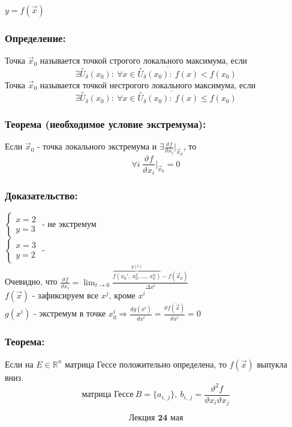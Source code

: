 \documentclass[12pt, letterpaper, twoside]{article}
\newcommand{\Underl}[1]{$\underline{\text{#1}}$}
\newcommand{\DS}{\displaystyle}
\newcommand{\mb}[1]{\mathbb{#1}}
\begin{document}
    $y = f(\vec{x})$
    \subsubsection*{Определение:}
    Точка $\vec{x}_0$ называется точкой \Underl{строгого локального максимума}, если
    \[\exists \overset{\circ}{U}_{\delta}(x_0):\ \forall x\in \overset{\circ}{U}_{\delta}(x_0):\ f(x) < f(x_0)\]
    Точка $\vec{x}_0$ называется точкой \Underl{нестрогого локального максимума}, если
    \[\exists \overset{\circ}{U}_{\delta}(x_0):\ \forall x\in \overset{\circ}{U}_{\delta}(x_0):\ f(x) \leq f(x_0)\]
    \subsubsection*{Теорема (необходимое условие экстремума):}
    Если $\vec{x}_0$ - точка локального экстремума и $\exists \frac{\vartheta f}{\vartheta x_i}\Big|_{\vec{x}_0}$, то
    \[\forall i\ \frac{\vartheta f}{\vartheta x_i}\Big|_{\vec{x}_0} = 0\]
    \subsubsection*{Доказательство:}$\begin{cases}
        x = 2\\
        y = 3
    \end{cases}$ - не экстремум\\
    $\begin{cases}
        x = 3\\
        y = 2
    \end{cases}$ -\\
    Очевидно, что $\frac{\vartheta f}{\vartheta x_i} = \DS \lim_{t\to 0} \frac{\overset{g(t)}{\overbrace{f(x_0',\ x_0^2,\dots,\ x^n_0)}} - f(\vec{x}_0)}{\Delta x^i}$\\
    $f(\vec{x})$ - зафиксируем все $x^j$, кроме $x^i$\\
    $g(x^i)$ - экстремум в точке $x_0^i\Rightarrow \frac{dg(x^i)}{dx^i} = \frac{\vartheta f(\vec{x})}{\vartheta x^i} = 0$
    \subsubsection*{Теорема:}
    Если на $E \in \mb{R}^n$ матрица Гессе положительно определена, то $f(\vec{x})$ выпукла вниз.
    \[\text{матрица Гессе}\ B = \{a_{i,\ j}\},\ b_{i,\ j} = \frac{\vartheta^2 f}{\vartheta x_i \vartheta x_j}\]

\[\textbf{Лекция 24 мая}\]
\end{document}
